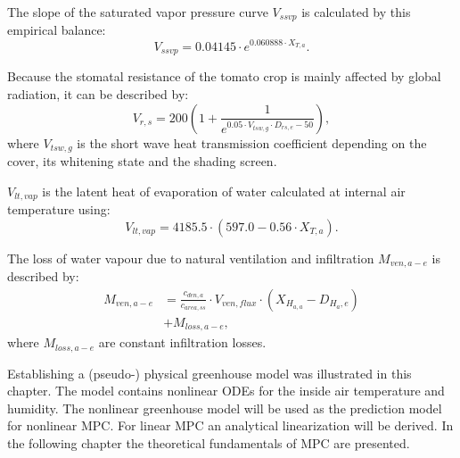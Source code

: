 The slope of the saturated vapor pressure curve $V_{ssvp}$ is calculated by this empirical balance:
\begin{equation}\label{eq:ssvp}
V_{ssvp} = 0.04145 \cdot e^{0.060888 \cdot X_{T,a}}.
\end{equation}

Because the stomatal resistance of the tomato crop is mainly affected by global radiation, it can be described by:
\begin{equation}\label{eq:vrs}
V_{r,s}=200\left(1+\frac{1}{e^{0.05 \cdot V_{tsw,g} \cdot D_{rs,e} - 50}}\right),
\end{equation}
where $V_{tsw,g}$ is the short wave heat transmission coefficient depending on the cover, its whitening state and the shading screen.

$V_{lt,vap}$ is the latent heat of evaporation of water calculated at internal air temperature using:
\begin{equation}\label{eq:vltvap}
V_{lt,vap} = 4185.5 \cdot \left(597.0 - 0.56 \cdot X_{T,a}\right).
\end{equation}

The loss of water vapour due to natural ventilation and infiltration $M_{ven,a-e}$ is described by:
\begin{equation}\label{eq:mven}
\begin{split}
M_{ven,a-e} &= \frac{c_{den,a}}{c_{area,ss}} \cdot V_{ven,flux} \cdot \left(X_{H_{a,a}}-D_{H_a,e}\right) \\
            &+ M_{loss,a-e},
\end{split}
\end{equation}
where $M_{loss,a-e}$ are constant infiltration losses.\par\medskip

Establishing a (pseudo-) physical greenhouse model was illustrated in this chapter.
The model contains nonlinear ODEs for the inside air temperature and humidity. 
The nonlinear greenhouse model will be used as the prediction model for nonlinear MPC.
For linear MPC an analytical linearization will be derived.
In the following chapter the theoretical fundamentals of MPC are presented.
